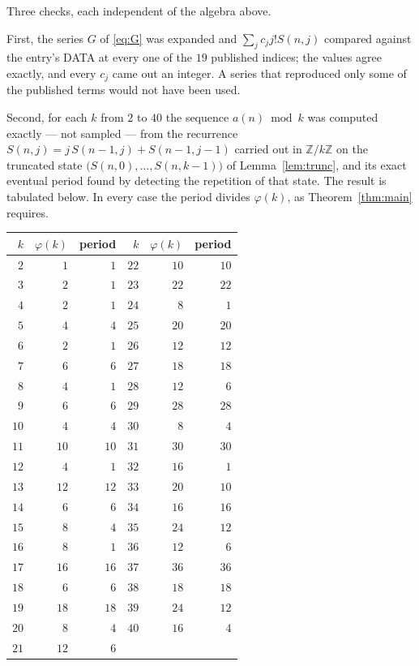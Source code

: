\documentclass[11pt,a4paper]{article}
\theoremstyle{plain}
\theoremstyle{definition}
\begin{document}
Three checks, each independent of the algebra above.

First, the series $G$ of \eqref{eq:G} was expanded and $\sum_j c_j j! S(n,j)$ compared
against the entry's DATA at every one of the $19$ published indices; the values
agree exactly, and every $c_j$ came out an integer. A series that reproduced only some of
the published terms would not have been used.

Second, for each $k$ from $2$ to $40$ the sequence $a(n)\bmod k$ was computed exactly
--- not sampled --- from the recurrence $S(n,j)=j\,S(n-1,j)+S(n-1,j-1)$ carried out in
$\mathbb{Z}/k\mathbb{Z}$ on the truncated state
$\bigl(S(n,0),\dots,S(n,k-1)\bigr)$ of Lemma~\ref{lem:trunc}, and its exact eventual
period found by detecting the repetition of that state. The result is tabulated below.
In every case the period divides $\varphi(k)$, as Theorem~\ref{thm:main} requires.

\begin{center}\small
\begin{tabular}{rrr@{\qquad\qquad}rrr}
$k$ & $\varphi(k)$ & period & $k$ & $\varphi(k)$ & period \\ \hline
$2$ & $1$ & $1$ & $22$ & $10$ & $10$ \\
$3$ & $2$ & $1$ & $23$ & $22$ & $22$ \\
$4$ & $2$ & $1$ & $24$ & $8$ & $1$ \\
$5$ & $4$ & $4$ & $25$ & $20$ & $20$ \\
$6$ & $2$ & $1$ & $26$ & $12$ & $12$ \\
$7$ & $6$ & $6$ & $27$ & $18$ & $18$ \\
$8$ & $4$ & $1$ & $28$ & $12$ & $6$ \\
$9$ & $6$ & $6$ & $29$ & $28$ & $28$ \\
$10$ & $4$ & $4$ & $30$ & $8$ & $4$ \\
$11$ & $10$ & $10$ & $31$ & $30$ & $30$ \\
$12$ & $4$ & $1$ & $32$ & $16$ & $1$ \\
$13$ & $12$ & $12$ & $33$ & $20$ & $10$ \\
$14$ & $6$ & $6$ & $34$ & $16$ & $16$ \\
$15$ & $8$ & $4$ & $35$ & $24$ & $12$ \\
$16$ & $8$ & $1$ & $36$ & $12$ & $6$ \\
$17$ & $16$ & $16$ & $37$ & $36$ & $36$ \\
$18$ & $6$ & $6$ & $38$ & $18$ & $18$ \\
$19$ & $18$ & $18$ & $39$ & $24$ & $12$ \\
$20$ & $8$ & $4$ & $40$ & $16$ & $4$ \\
$21$ & $12$ & $6$ &  & & \\
\end{tabular}
\end{center}
\end{document}
